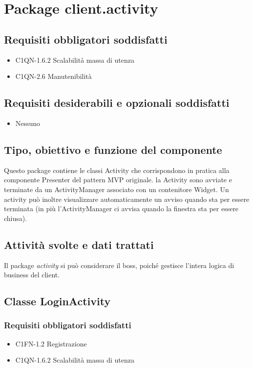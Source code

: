 \newpage
\section{Package client.activity} %
\subsection*{Requisiti obbligatori soddisfatti}
\begin{itemize}
	\item C1QN-1.6.2 Scalabilit\`a massa di utenza
	\item C1QN-2.6 Manutenibilit\`a
\end{itemize}
\subsection*{Requisiti desiderabili e opzionali soddisfatti}
\begin{itemize}
    \item Nessuno
\end{itemize}
\subsection*{Tipo, obiettivo e funzione del componente}
Questo package contiene le classi Activity che corrispondono in pratica alla
componente Presenter del pattern MVP originale. la Activity sono avviate e
terminate da un ActivityManager associato con un contenitore Widget. Un activity
pu\`o inoltre visualizzare automaticamente un avviso quando sta per essere
terminata (in pi\`u l'ActivityManager ci avvisa quando la finestra sta per
essere chiusa).
\subsection*{Attivit\`a svolte e dati trattati} Il package \emph{activity} si
pu\`o considerare il boss, poich\'e gestisce l'intera logica di business del
client.

\subsection{Classe LoginActivity}
\subsubsection*{Requisiti obbligatori soddisfatti}
\begin{itemize}
	\item C1FN-1.2 Registrazione
	\item C1QN-1.6.2 Scalabilit\`a massa di utenza
\end{itemize}
